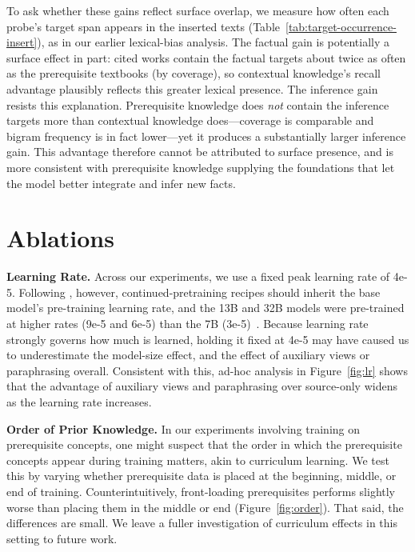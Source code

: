 \documentclass[11pt]{article}
\begin{document}
To ask whether these gains reflect surface overlap, we measure how often each probe's target span appears in the inserted texts (Table~\ref{tab:target-occurrence-insert}), as in our earlier lexical-bias analysis. The factual gain is potentially a surface effect in part: cited works contain the factual targets about twice as often as the prerequisite textbooks (by coverage), so contextual knowledge's recall advantage plausibly reflects this greater lexical presence. The inference gain resists this explanation. Prerequisite knowledge does \textit{not} contain the inference targets more than contextual knowledge does---coverage is comparable and bigram frequency is in fact lower---yet it produces a substantially larger inference gain. This advantage therefore cannot be attributed to surface presence, and is more consistent with prerequisite knowledge supplying the foundations that let the model better integrate and infer new facts.

\section{Ablations}

\textbf{Learning Rate.} Across our experiments, we use a fixed peak learning rate of 4e-5. Following \citet{parmar2024reuse}, however, continued-pretraining recipes should inherit the base model's pre-training learning rate, and the 13B and 32B models were pre-trained at higher rates (9e-5 and 6e-5) than the 7B (3e-5)~\cite{olmo20242}. Because learning rate strongly governs how much is learned, holding it fixed at 4e-5 may have caused us to underestimate the model-size effect, and the effect of auxiliary views or paraphrasing overall. Consistent with this, ad-hoc analysis in Figure~\ref{fig:lr} shows that the advantage of auxiliary views and paraphrasing over source-only  widens as the learning rate increases.
 
\textbf{Order of Prior Knowledge.} In our experiments involving training on prerequisite concepts, one might suspect that the order in which the prerequisite concepts appear during training matters, akin to curriculum learning. We test this by varying whether prerequisite data is placed at the beginning, middle, or end of training. Counterintuitively, front-loading prerequisites performs slightly worse than placing them in the middle or end (Figure~\ref{fig:order}). That said, the differences are small. We leave a fuller investigation of curriculum effects in this setting to future work.
\end{document}
